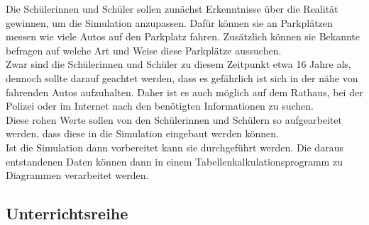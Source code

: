 Die Schülerinnen und Schüler sollen zunächst Erkenntnisse über die Realität gewinnen, um die Simulation anzupassen. Dafür können sie an Parkplätzen messen wie viele Autos auf den Parkplatz fahren. Zusätzlich können sie Bekannte befragen auf welche Art und Weise diese Parkplätze aussuchen.\\
Zwar sind die Schülerinnen und Schüler zu diesem Zeitpunkt etwa 16 Jahre als, dennoch sollte darauf geachtet werden, dass es gefährlich ist sich in der nähe von fahrenden Autos aufzuhalten. Daher ist es auch möglich auf dem Rathaus, bei der Polizei oder im Internet nach den benötigten Informationen zu suchen. \\
Diese rohen Werte sollen von den Schülerinnen und Schülern so aufgearbeitet werden, dass diese in die Simulation eingebaut werden können.\\
 Ist die Simulation dann vorbereitet kann sie durchgeführt werden. Die daraus entstandenen Daten können dann in einem Tabellenkalkulationsprogramm zu Diagrammen verarbeitet werden. 

\subsection{Unterrichtsreihe}

